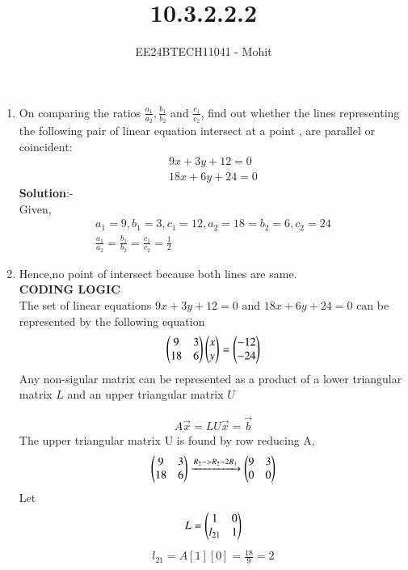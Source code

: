 \documentclass[journal]{IEEEtran}
\numberwithin{equation}{enumi}
\numberwithin{figure}{enumi}
\begin{document}

\title{10.3.2.2.2}
\author{EE24BTECH11041 - Mohit}
{\let\newpage\relax\maketitle}
\begin{enumerate}
\item On comparing the ratios $\frac{a_1}{a_2},\frac{b_1}{b_2}$ and $\frac{c_1}{c_2}$, find out whether the lines representing the following pair of linear equation intersect at a point , are parallel or coincident:\\
\begin{align}
9x + 3y + 12 = 0 \\
18x + 6y + 24 = 0
\end{align}
\textbf{Solution}:-\\
Given,
\begin{align}
a_1=9,b_1=3,c_1=12,a_2=18=b_2=6,c_2=24 \\
\frac{a_1}{a_2}=\frac{b_1}{b_2}=\frac{c_1}{c_2}=\frac{1}{2}
\end{align}
\item Hence,no point of intersect because both lines are same.\\
\textbf{CODING LOGIC}\\



The set of linear equations $9x + 3y + 12 = 0$ and $18x + 6y + 24 = 0$ can be represented by the following equation
\begin{align}
    \begin{pmatrix}9&3\\18&6\end{pmatrix}\begin{pmatrix}x\\y\end{pmatrix}=\begin{pmatrix}-12\\-24\end{pmatrix}
\end{align}
Any non-sigular matrix can be represented as a product of a lower triangular matrix $L$ and an
upper triangular matrix $U$

\begin{align}
    A\vec{x} = LU\vec{x} = \vec{b}
\end{align}
The upper triangular matrix U is found by row reducing A,
\begin{align}
   \begin{pmatrix}9&3\\18&6\end{pmatrix} \xrightarrow{R_2 -> R_2 - 2R_1 }\begin{pmatrix}9&3\\0&0\end{pmatrix}  
\end{align}
Let 
\begin{align}
    L = \begin{pmatrix}1 & 0\\ l_{21} & 1\end{pmatrix}
\end{align}
\begin{align}
l_{21} = A[1][0]=\frac{18}{9}=2
\end{align}



\end{enumerate}
\end{document}
